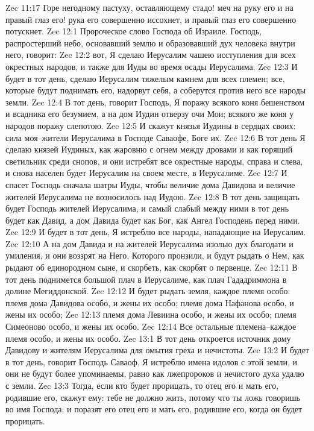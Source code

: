 Zec 11:17  Горе негодному пастуху, оставляющему стадо! меч на руку его и на правый глаз его! рука его совершенно иссохнет, и правый глаз его совершенно потускнет.
Zec 12:1  Пророческое слово Господа об Израиле. Господь, распростерший небо, основавший землю и образовавший дух человека внутри него, говорит:
Zec 12:2  вот, Я сделаю Иерусалим чашею исступления для всех окрестных народов, и также для Иуды во время осады Иерусалима.
Zec 12:3  И будет в тот день, сделаю Иерусалим тяжелым камнем для всех племен; все, которые будут поднимать его, надорвут себя, а соберутся против него все народы земли.
Zec 12:4  В тот день, говорит Господь, Я поражу всякого коня бешенством и всадника его безумием, а на дом Иудин отверзу очи Мои; всякого же коня у народов поражу слепотою.
Zec 12:5  И скажут князья Иудины в сердцах своих: сила моя--жители Иерусалима в Господе Саваофе, Боге их.
Zec 12:6  В тот день Я сделаю князей Иудиных, как жаровню с огнем между дровами и как горящий светильник среди снопов, и они истребят все окрестные народы, справа и слева, и снова населен будет Иерусалим на своем месте, в Иерусалиме.
Zec 12:7  И спасет Господь сначала шатры Иуды, чтобы величие дома Давидова и величие жителей Иерусалима не возносилось над Иудою.
Zec 12:8  В тот день защищать будет Господь жителей Иерусалима, и самый слабый между ними в тот день будет как Давид, а дом Давида будет как Бог, как Ангел Господень перед ними.
Zec 12:9  И будет в тот день, Я истреблю все народы, нападающие на Иерусалим.
Zec 12:10  А на дом Давида и на жителей Иерусалима изолью дух благодати и умиления, и они воззрят на Него, Которого пронзили, и будут рыдать о Нем, как рыдают об единородном сыне, и скорбеть, как скорбят о первенце.
Zec 12:11  В тот день поднимется большой плач в Иерусалиме, как плач Гададриммона в долине Мегиддонской.
Zec 12:12  И будет рыдать земля, каждое племя особо: племя дома Давидова особо, и жены их особо; племя дома Нафанова особо, и жены их особо;
Zec 12:13  племя дома Левиина особо, и жены их особо; племя Симеоново особо, и жены их особо.
Zec 12:14  Все остальные племена--каждое племя особо, и жены их особо.
Zec 13:1  В тот день откроется источник дому Давидову и жителям Иерусалима для омытия греха и нечистоты.
Zec 13:2  И будет в тот день, говорит Господь Саваоф, Я истреблю имена идолов с этой земли, и они не будут более упоминаемы, равно как лжепророков и нечистого духа удалю с земли.
Zec 13:3  Тогда, если кто будет прорицать, то отец его и мать его, родившие его, скажут ему: тебе не должно жить, потому что ты ложь говоришь во имя Господа; и поразят его отец его и мать его, родившие его, когда он будет прорицать.
